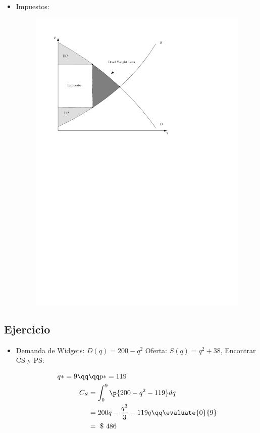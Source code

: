 \begin{itemize}
    \item Impuestos: 
        \begin{figure}[!htb]
            \centering
            \includegraphics[]{Clases/figs/06} 
        \end{figure}
\end{itemize}


\subsection{Ejercicio}
\begin{itemize}
    \item Demanda de Widgets: $\displaystyle D(q) = 200-q^2$ Oferta: $\displaystyle S(q) = q^2+38$, Encontrar CS y PS:  
        \begin{center}
           \begin{align*}
               q* = 9 \qq & \qq p*=119 \\ 
               C_S &= \int_{0}^{9}\p{200-q^2-119} dq \\ 
                &= 200q-\frac{q^3}{3} -119q \qq \evaluate{0}{9} \\ 
                & = \text{ \$ }486 \\ 
           \end{align*}
        \end{center}
\end{itemize}
